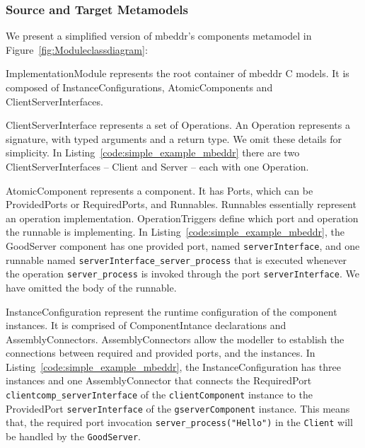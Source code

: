 \subsubsection{Source and Target Metamodels}


We present a simplified version of mbeddr's components metamodel in
Figure~\ref{fig:Moduleclassdiagram}:
\begin{compactdesc}
	
\item[ImplementationModule] represents the root container of mbeddr C models.
It is composed of InstanceConfigurations, AtomicComponents and
ClientServerInterfaces. 
	
\item[ClientServerInterface] represents a set of Operations. An Operation
represents a signature, with typed arguments and a return type.
We omit these details for simplicity. In
Listing~\ref{code:simple_example_mbeddr} there are two ClientServerInterfaces --
Client and Server -- each with one Operation.

\item[AtomicComponent] represents a component. It has Ports, which can be
ProvidedPorts or RequiredPorts, and Runnables. Runnables essentially represent
an operation implementation. OperationTriggers define which port and operation
the runnable is implementing. In Listing~\ref{code:simple_example_mbeddr}, the
GoodServer component has one provided port, named \verb=serverInterface=, and
one runnable named \verb=serverInterface_server_process= that is executed
whenever the operation \verb=server_process= is invoked through the port
\verb=serverInterface=. We have omitted the body of the runnable.
	
\item[InstanceConfiguration] represent the runtime configuration of the
component instances. It is comprised of ComponentIntance declarations and
AssemblyConnectors. AssemblyConnectors allow the modeller to establish the
connections between required and provided ports, and the instances.  In
Listing~\ref{code:simple_example_mbeddr}, the InstanceConfiguration has three
instances and one AssemblyConnector that connects the RequiredPort
\verb=clientcomp_serverInterface= of the \verb=clientComponent= instance to the
ProvidedPort \verb=serverInterface= of the \verb=gserverComponent= instance.
This means that, the required port invocation \verb=server_process("Hello")= in
the \verb=Client= will be handled by the \verb=GoodServer=.

\end{compactdesc}

